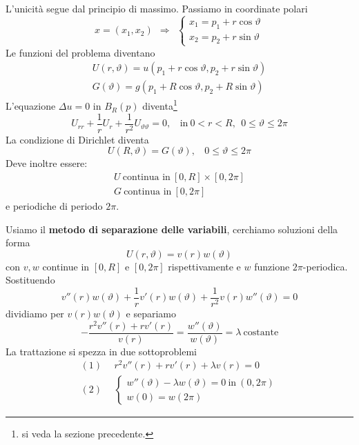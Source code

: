 \documentclass[10pt,a4paper,twoside,openright]{book}
\begin{document}
\begin{dimostrazione}
L'unicità segue dal principio di massimo. Passiamo in coordinate polari
\begin{equation*}
x=(x_{1},x_{2}) \ \ \Rightarrow \ \ \begin{cases}
x_{1} =p_{1} +r\cos \vartheta \\
x_{2} =p_{2} +r\sin \vartheta 
\end{cases}
\end{equation*}
Le funzioni del problema diventano
\begin{gather*}
U(r,\vartheta) =u( p_{1} +r\cos \vartheta,p_{2} +r\sin \vartheta)\\
G(\vartheta) =g( p_{1} +R\cos \vartheta,p_{2} +R\sin \vartheta)
\end{gather*}
L'equazione $\Delta u=0$ in $B_{R}(p)$ diventa\footnote{si veda la sezione precedente.}
\begin{equation*}
U_{rr} +\frac{1}{r} U_{r} +\frac{1}{r^{2}} U_{\vartheta \vartheta } =0,\ \ \ \ \text{in} \ 0< r< R,\ \ 0\leqslant \vartheta \leqslant 2\pi 
\end{equation*}
La condizione di Dirichlet diventa
\begin{equation*}
U(R,\vartheta) =G(\vartheta),\ \ \ \ 0\leqslant \vartheta \leqslant 2\pi 
\end{equation*}
Deve inoltre essere:
\begin{gather*}
U\ \text{continua in} \ [ 0,R] \times [ 0,2\pi ]\\
G\ \text{continua in} \ [ 0,2\pi ]
\end{gather*}
e periodiche di periodo $2\pi $.

Usiamo il \textbf{metodo di separazione delle variabili}, cerchiamo soluzioni della forma
\begin{equation}
U(r,\vartheta) =v(r) w(\vartheta)
\label{eq:poisson-cerchio-6-sep-var}
\end{equation}
con $v,w$ continue in $[ 0,R]$ e $[ 0,2\pi ]$ rispettivamente e $w$ funzione $2\pi $-periodica. Sostituendo
\begin{equation*}
v''(r) w(\vartheta) +\frac{1}{r} v'(r) w(\vartheta) +\frac{1}{r^{2}} v(r) w''(\vartheta) =0
\end{equation*}
dividiamo per $v(r) w(\vartheta)$ e separiamo
\begin{equation*}
-\frac{r^{2} v''(r) +rv'(r)}{v(r)} =\frac{w''(\vartheta)}{w(\vartheta)} =\lambda \ \text{costante}
\end{equation*}
La trattazione si spezza in due sottoproblemi
\begin{align*}
(1) & \ \ r^{2} v''(r) +rv'(r) +\lambda v(r) =0\\
(2) & \ \ \begin{cases}
w''(\vartheta) -\lambda w(\vartheta) =0\ \text{in} \ (0,2\pi)\\
w(0) =w(2\pi)
\end{cases}
\end{align*}


\end{dimostrazione}
\end{document}

